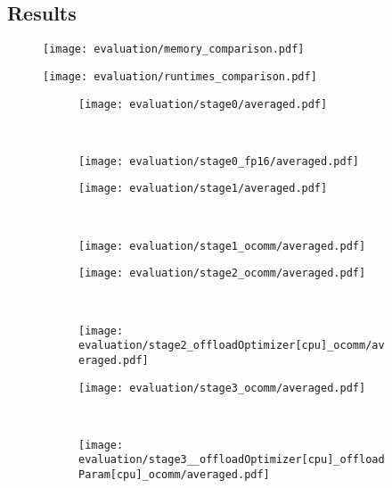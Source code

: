 \subsection{Results}

\begin{figure}[H]
    \centering
    \texttt{[image: evaluation/memory\_comparison.pdf]}
\end{figure}

\begin{figure}[H]
    \centering
    \texttt{[image: evaluation/runtimes\_comparison.pdf]}
\end{figure}

\begin{figure}[H]

    \centering

    \begin{subfigure}[t]{0.49\textwidth}
        \centering
        \texttt{[image: evaluation/stage0/averaged.pdf]}
    \end{subfigure}%
    ~
    \begin{subfigure}[t]{0.49\textwidth}
        \centering
        \texttt{[image: evaluation/stage0\_fp16/averaged.pdf]}
    \end{subfigure}

    \begin{subfigure}[t]{0.49\textwidth}
        \centering
        \texttt{[image: evaluation/stage1/averaged.pdf]}
    \end{subfigure}%
    ~
    \begin{subfigure}[t]{0.49\textwidth}
        \centering
        \texttt{[image: evaluation/stage1\_ocomm/averaged.pdf]}
    \end{subfigure}

    \begin{subfigure}[t]{0.49\textwidth}
        \centering
        \texttt{[image: evaluation/stage2\_ocomm/averaged.pdf]}
    \end{subfigure}%
    ~
    \begin{subfigure}[t]{0.49\textwidth}
        \centering
        \texttt{[image: evaluation/stage2\_offloadOptimizer[cpu]\_ocomm/averaged.pdf]}
    \end{subfigure}

    \begin{subfigure}[t]{0.49\textwidth}
        \centering
        \texttt{[image: evaluation/stage3\_ocomm/averaged.pdf]}
    \end{subfigure}%
    ~
    \begin{subfigure}[t]{0.49\textwidth}
        \centering
        \texttt{[image: evaluation/stage3\_\_offloadOptimizer[cpu]\_offloadParam[cpu]\_ocomm/averaged.pdf]}
    \end{subfigure}
    
\end{figure}
